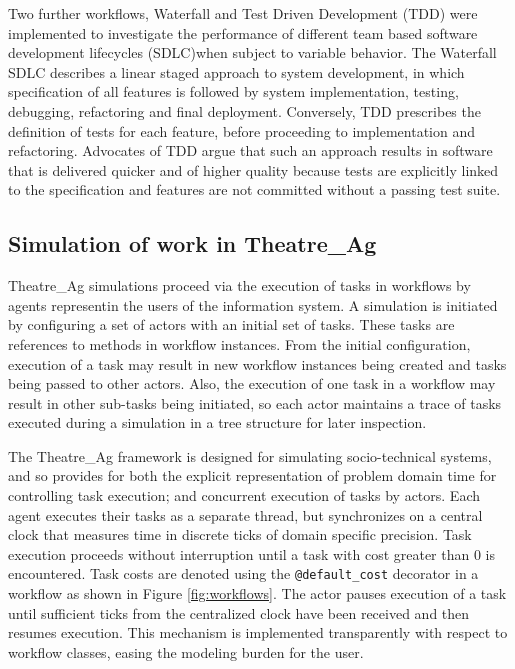 \documentclass{llncs}
\begin{document}
Two further workflows, Waterfall and Test Driven Development (TDD) were implemented to investigate the performance of
different team based software development lifecycles (SDLC)when subject to variable behavior.  The Waterfall SDLC
\cite{benington83production} describes a linear staged approach to system development, in which specification of all
features is followed by system implementation, testing, debugging, refactoring and final deployment.  Conversely, TDD
\cite{beck02test} prescribes the definition of tests for each feature, before proceeding to implementation and
refactoring.  Advocates of TDD argue that such an approach results in software that is delivered quicker and of higher
quality because tests are explicitly linked to the specification and features are not committed without a passing test
suite.



\subsection{Simulation of work in Theatre\_Ag}


Theatre\_Ag simulations proceed via the execution of tasks in workflows by agents representin the users of the
information system.  A simulation is initiated by configuring a set of actors with an initial set of tasks.  These tasks
are references to methods in workflow instances.  From the initial configuration, execution of a task may result in new
workflow instances being created and tasks being passed to other actors.  Also, the execution of one task in a workflow
may result in other sub-tasks being initiated, so each actor maintains a trace of tasks executed during a simulation in
a tree structure for later inspection.

The Theatre\_Ag framework is designed for simulating socio-technical systems, and so provides for both the explicit
representation of problem domain time for controlling task execution; and concurrent execution of tasks by actors.  Each
agent executes their tasks as a separate thread, but synchronizes on a central clock that measures time in discrete
ticks of domain specific precision.  Task execution proceeds without interruption until a task with cost greater than 0
is encountered.  Task costs are denoted using the \lstinline!@default_cost! decorator in a workflow as shown in Figure
\ref{fig:workflows}.  The actor pauses execution of a task until sufficient ticks from the centralized clock have been
received and then resumes execution.  This mechanism is implemented transparently with respect to workflow classes,
easing the modeling burden for the user.
\end{document}
